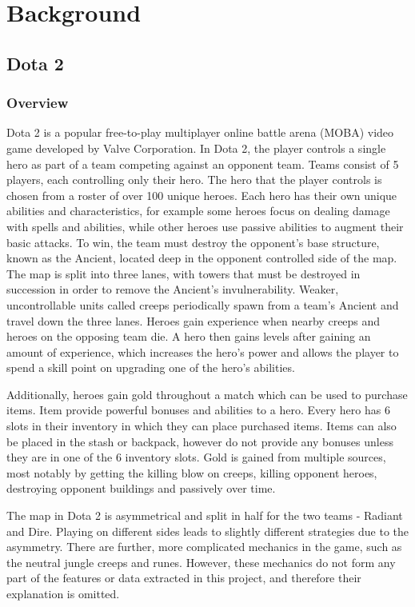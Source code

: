 \documentclass[Report.tex]{subfiles}
\begin{document}
\section{Background}

\subsection{Dota 2}
\subsubsection{Overview}
Dota 2 is a popular free-to-play multiplayer online battle arena (MOBA) video game developed by Valve Corporation. In Dota 2, the player controls a single hero as part of a team competing against an opponent team. Teams consist of 5 players, each controlling only their hero. The hero that the player controls is chosen from a roster of over 100 unique heroes. Each hero has their own unique abilities and characteristics, for example some heroes focus on dealing damage with spells and abilities, while other heroes use passive abilities to augment their basic attacks. To win, the team must destroy the opponent's base structure, known as the Ancient, located deep in the opponent controlled side of the map. The map is split into three lanes, with towers that must be destroyed in succession in order to remove the Ancient's invulnerability. Weaker, uncontrollable units called creeps periodically spawn from a team's Ancient and travel down the three lanes. Heroes gain experience when nearby creeps and heroes on the opposing team die. A hero then gains levels after gaining an amount of experience, which increases the hero's power and allows the player to spend a skill point on upgrading one of the hero's abilities. 

Additionally, heroes gain gold throughout a match which can be used to purchase items. Item provide powerful bonuses and abilities to a hero. Every hero has 6 slots in their inventory in which they can place purchased items. Items can also be placed in the stash or backpack, however do not provide any bonuses unless they are in one of the 6 inventory slots. Gold is gained from multiple sources, most notably by getting the killing blow on creeps, killing opponent heroes, destroying opponent buildings and passively over time. 


The map in Dota 2 is asymmetrical and split in half for the two teams - Radiant and Dire. Playing on different sides leads to slightly different strategies due to the asymmetry. There are further, more complicated mechanics in the game, such as the neutral jungle creeps and runes. However, these mechanics do not form any part of the features or data extracted in this project, and therefore their explanation is omitted. 
\end{document}

